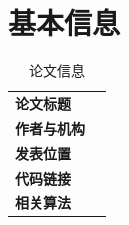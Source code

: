 \section{基本信息}

\begin{table}[H]
  \centering
  \begin{tabular}{>{\bfseries}p{3cm}p{10cm}}
    \toprule
    论文标题 &  \\
    作者与机构 &  \\
    发表位置 &  \\
    代码链接 &  \\
    相关算法 &  \\
    \bottomrule
  \end{tabular}
  \caption{论文信息}
\end{table}
